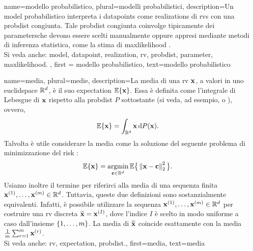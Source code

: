 {
	name={modello probabilistico}, plural={modelli probabilistici},
	description={Un \gls{model} probabilistico interpreta i \glspl{datapoint} 
		come \glspl{realization} di \glspl{rv} con una \gls{probdist} congiunta. Tale \gls{probdist} congiunta coinvolge 
		tipicamente dei \glspl{parameter}che devono essere scelti manualmente oppure appresi mediante
metodi di inferenza statistica, come la stima di \gls{maxlikelihood} \cite{LC}.					
									\\ 
		Si veda anche: \gls{model}, \gls{datapoint}, \gls{realization}, \gls{rv}, \gls{probdist}, \gls{parameter}, \gls{maxlikelihood}. }, 
	first = {modello probabilistico}, text={modello probabilistico} 
}



{name={media}, plural={medie},
	description={La  media di una \gls{rv} ${\bf x}$, a 
 		valori in uno \gls{euclidspace} $\mathbb{R}^{d}$, è il suo 
 		\gls{expectation} $\mathbb{E}\{{\bf x}\}$. Essa è definita come l'integrale di Lebesgue  
 		di ${\bf x}$ rispetto alla \gls{probdist} $P$ sottostante (si veda, ad esempio, 
		\cite{RudinBookPrinciplesMatheAnalysis} o \cite{BillingsleyProbMeasure}), ovvero,
		\[
			\mathbb{E}\{{\bf x}\} = \int_{\mathbb{R}^{d}} {\bf x} \, \mathrm{d}P({\bf x}).
		\] 
		Talvolta è utile considerare la media come la soluzione del seguente problema 
		di minimizzazione del \gls{risk} \cite{BertsekasProb}:
		\[
			\mathbb{E}\{{\bf x}\} = \operatorname*{argmin}_{{\bf c} \in \mathbb{R}^{d}} 
			\mathbb{E} \big\{\left\Vert {{\bf x}- {\bf c}} \right\Vert_{2}^{2}\big \}.
		\] 
		Usiamo inoltre il termine per riferirci alla media di una sequenza finita
		${\bf x}^{(1)}, \ldots, {\bf x}^{(m)} \in \mathbb{R}^{d}$. Tuttavia, 
		queste due definizioni sono sostanzialmente equivalenti. Infatti, è possibile utilizzare la sequenza
		${\bf x}^{(1)}, \ldots, {\bf x}^{(m)} \in \mathbb{R}^{d}$ per costruire una
		\gls{rv} discreta $\widetilde{{\bf x}}={\bf x}^{(I)}$, dove l'indice $I$ è scelto in modo uniforme 
		a caso dall'insieme $\{1,\ldots,m\}$. La media di $\widetilde{{\bf x}}$ coincide  
		esattamente con la media $\frac{1}{m} \sum_{r=1}^{m} {\bf x}^{(r)}$.
				\\ 
		Si veda anche: \gls{rv}, \gls{expectation}, \gls{probdist}.}, 
	first={media},
	text={media} 
}


